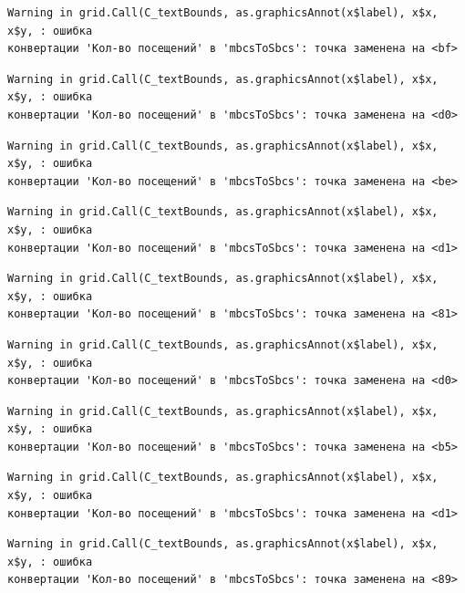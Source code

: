 \documentclass[
  letterpaper,
  DIV=11,
  numbers=noendperiod]{scrreprt}
\begin{document}
\begin{verbatim}
Warning in grid.Call(C_textBounds, as.graphicsAnnot(x$label), x$x, x$y, : ошибка
конвертации 'Кол-во посещений' в 'mbcsToSbcs': точка заменена на <bf>
\end{verbatim}

\begin{verbatim}
Warning in grid.Call(C_textBounds, as.graphicsAnnot(x$label), x$x, x$y, : ошибка
конвертации 'Кол-во посещений' в 'mbcsToSbcs': точка заменена на <d0>
\end{verbatim}

\begin{verbatim}
Warning in grid.Call(C_textBounds, as.graphicsAnnot(x$label), x$x, x$y, : ошибка
конвертации 'Кол-во посещений' в 'mbcsToSbcs': точка заменена на <be>
\end{verbatim}

\begin{verbatim}
Warning in grid.Call(C_textBounds, as.graphicsAnnot(x$label), x$x, x$y, : ошибка
конвертации 'Кол-во посещений' в 'mbcsToSbcs': точка заменена на <d1>
\end{verbatim}

\begin{verbatim}
Warning in grid.Call(C_textBounds, as.graphicsAnnot(x$label), x$x, x$y, : ошибка
конвертации 'Кол-во посещений' в 'mbcsToSbcs': точка заменена на <81>
\end{verbatim}

\begin{verbatim}
Warning in grid.Call(C_textBounds, as.graphicsAnnot(x$label), x$x, x$y, : ошибка
конвертации 'Кол-во посещений' в 'mbcsToSbcs': точка заменена на <d0>
\end{verbatim}

\begin{verbatim}
Warning in grid.Call(C_textBounds, as.graphicsAnnot(x$label), x$x, x$y, : ошибка
конвертации 'Кол-во посещений' в 'mbcsToSbcs': точка заменена на <b5>
\end{verbatim}

\begin{verbatim}
Warning in grid.Call(C_textBounds, as.graphicsAnnot(x$label), x$x, x$y, : ошибка
конвертации 'Кол-во посещений' в 'mbcsToSbcs': точка заменена на <d1>
\end{verbatim}

\begin{verbatim}
Warning in grid.Call(C_textBounds, as.graphicsAnnot(x$label), x$x, x$y, : ошибка
конвертации 'Кол-во посещений' в 'mbcsToSbcs': точка заменена на <89>
\end{verbatim}
\end{document}
